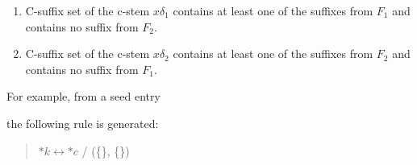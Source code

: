 \begin{enumerate}
\item C-suffix set of the c-stem $x\delta_1$ contains at least one of the suffixes from $F_1$ and contains no suffix from $F_2$.
\item C-suffix set of the c-stem $x\delta_2$ contains at least one of the suffixes from $F_2$ and contains no suffix from $F_1$.
\end{enumerate}

\noindent For example, from a seed entry 
\begin{quote}
\end{quote}
the following rule is generated:
\begin{quote}
$*k \leftrightarrow *c$ / (\{\}, \{\}) 
\end{quote}


